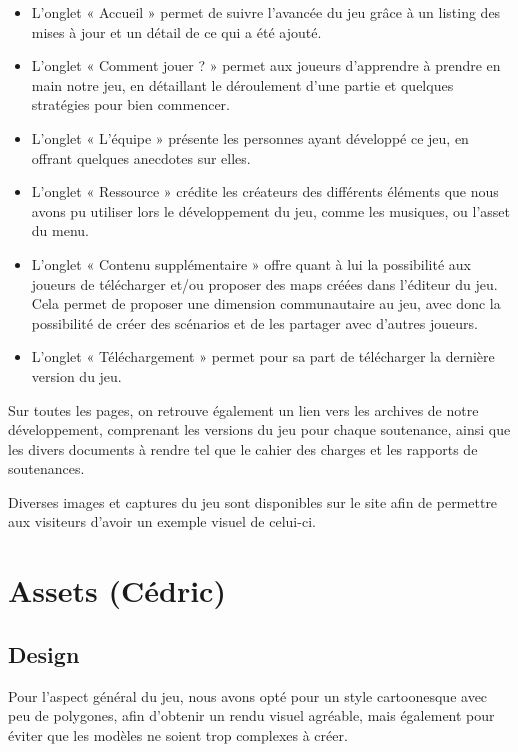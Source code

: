 \documentclass[12pt]{report}
\begin{document}
\begin{itemize}
    \item L’onglet « Accueil » permet de suivre l’avancée du jeu grâce à un listing
        des mises à jour et un détail de ce qui a été ajouté.
    \item L’onglet « Comment jouer ? » permet aux joueurs d’apprendre à prendre
        en main notre jeu, en détaillant le déroulement d’une partie et quelques
        stratégies pour bien commencer.
    \item L’onglet « L’équipe » présente les personnes ayant développé ce jeu,
        en offrant quelques anecdotes sur elles.
    \item L’onglet « Ressource » crédite les créateurs des différents éléments
        que nous avons pu utiliser lors le développement du jeu, comme  les
        musiques, ou l’asset du menu.
    \item L’onglet « Contenu supplémentaire » offre quant à lui la possibilité
        aux joueurs de télécharger et/ou proposer des maps créées dans l’éditeur
        du jeu. Cela permet de proposer une dimension communautaire au jeu, avec
        donc la possibilité de créer des scénarios et de les partager avec
        d'autres joueurs.
    \item L’onglet « Téléchargement » permet pour sa part de télécharger la
        dernière version du jeu.
\end{itemize}

Sur toutes les pages, on retrouve également un lien vers les archives de notre
développement, comprenant les versions du jeu pour chaque soutenance, ainsi que
les divers documents à rendre tel que le cahier des charges et les rapports de
soutenances.

Diverses images et captures du jeu sont disponibles sur le site afin de
permettre aux visiteurs d’avoir un exemple visuel de celui-ci.

\chapter{Assets (Cédric)}

\section{Design}

Pour l’aspect général du jeu, nous avons opté pour un style cartoonesque avec
peu de polygones, afin d’obtenir un rendu visuel agréable, mais également pour
éviter que les modèles ne soient trop complexes à créer. 
\end{document}
